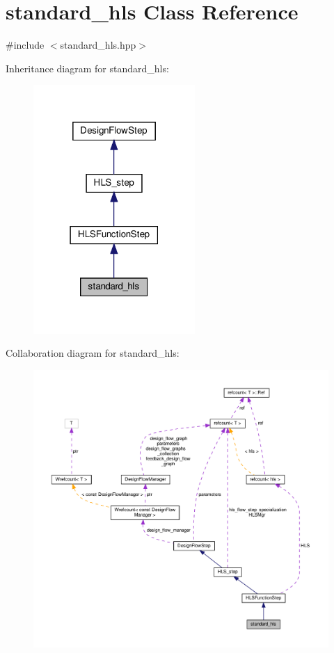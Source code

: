 \hypertarget{classstandard__hls}{}\section{standard\+\_\+hls Class Reference}
\label{classstandard__hls}


{\ttfamily \#include $<$standard\+\_\+hls.\+hpp$>$}



Inheritance diagram for standard\+\_\+hls\+:
\nopagebreak
\begin{figure}[H]
\begin{center}
\leavevmode
\includegraphics[width=174pt]{d4/dcd/classstandard__hls__inherit__graph}
\end{center}
\end{figure}


Collaboration diagram for standard\+\_\+hls\+:
\nopagebreak
\begin{figure}[H]
\begin{center}
\leavevmode
\includegraphics[width=350pt]{d9/df8/classstandard__hls__coll__graph}
\end{center}
\end{figure}
